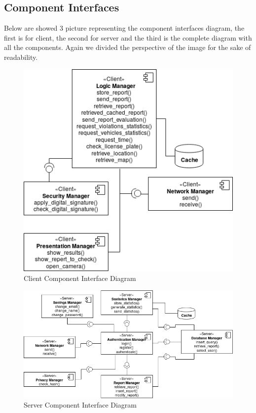 \documentclass{article}
\begin{document}
\subsection{Component Interfaces}

Below are showed 3 picture representing the component interfaces diagram, the first is for client, the second
for server and the third is the complete diagram with all the components. Again we divided the perspective
of the image for the sake of readability.

\begin{figure}[H]
    \centering
    \includegraphics[scale=0.5]{img/component_interface_diagrams/client_component_interface.png}
    \caption{Client Component Interface Diagram}
\end{figure}
\begin{figure}[H]
    \centering
    \includegraphics[scale=0.5]{img/component_interface_diagrams/server_component_interface.png}
    \caption{Server Component Interface Diagram}
\end{figure}
\end{document}
